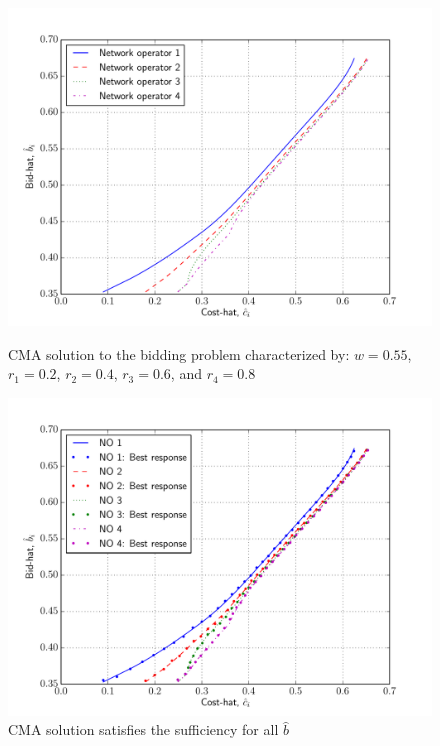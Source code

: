 \begin{figure}[p!]
  \includegraphics[width=\figsize]{Indirect/Figures/combined_4}
  \caption{CMA solution to the bidding problem characterized by: $w=0.55$, $r_1 = 0.2$, $r_2 = 0.4$, $r_3 = 0.6$, and $r_4 = 0.8$}
  \label{fig:combined_4_indirect}
  \vspace{10mm}
  \includegraphics[width=\figsize]{Indirect/Figures/combined_4_sufficiency}
  \caption{CMA solution satisfies the sufficiency for all $\hat{b}$}
  \label{fig:combined_4_sufficiency_indirect}
\end{figure}

